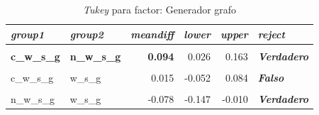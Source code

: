 \documentclass{article}
\begin{document}
\begin{table}[htbp]
  \centering
  \caption{\textit{Tukey} para factor: Generador grafo}
    \begin{tabular}{llrrrl}
    \toprule
    \textit{\textbf{group1}} & \textit{\textbf{group2}} & \multicolumn{1}{l}{\textit{\textbf{meandiff}}} & \multicolumn{1}{l}{\textit{\textbf{lower}}} & \multicolumn{1}{l}{\textit{\textbf{upper}}} & \textit{\textbf{reject}} \\
    \midrule
          &       &       &       &       &  \\
    \textbf{c\_w\_s\_g} & \textbf{n\_w\_s\_g} & \textbf{0.094} & 0.026 & 0.163 & \textit{\textbf{Verdadero}} \\
          &       &       &       &       &  \\
    c\_w\_s\_g & w\_s\_g & 0.015 & -0.052 & 0.084 & \textit{\textbf{Falso}} \\
          &       &       &       &       &  \\
    n\_w\_s\_g & w\_s\_g & -0.078 & -0.147 & -0.010 & \textit{\textbf{Verdadero}} \\
    \bottomrule
    \end{tabular}%
  \label{tab:addlabel}%
\end{table}%
\end{document}
